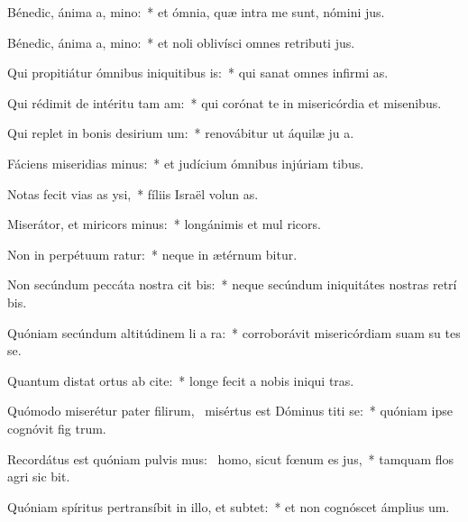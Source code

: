 \item Bénedic, ánima a, mino:~* et ómnia, quæ intra me sunt, nómini  jus.
\item Bénedic, ánima a, mino:~* et noli oblivísci omnes retributi jus.
\item Qui propitiátur ómnibus iniquitibus is:~* qui sanat omnes infirmi as.
\item Qui rédimit de intéritu tam am:~* qui corónat te in misericórdia et misenibus.
\item Qui replet in bonis desirium um:~* renovábitur ut áquilæ ju a.
\item Fáciens miseridias minus:~* et judícium ómnibus injúriam tibus.
\item Notas fecit vias as ysi,~* fíliis Israël volun as.
\item Miserátor, et miricors minus:~* longánimis et mul ricors.
\item Non in perpétuum ratur:~* neque in ætérnum bitur.
\item Non secúndum peccáta nostra cit bis:~* neque secúndum iniquitátes nostras retrí bis.
\item Quóniam secúndum altitúdinem li a ra:~* corroborávit misericórdiam suam su tes se.
\item Quantum distat ortus ab cite:~* longe fecit a nobis iniqui tras.
\item Quómodo miserétur pater filirum,~\pscross{} misértus est Dóminus titi se:~* quóniam ipse cognóvit fig trum.
\item Recordátus est quóniam pulvis mus:~\pscross{} homo, sicut fœnum es jus,~* tamquam flos agri sic bit.
\item Quóniam spíritus pertransíbit in illo, et  subtet:~* et non cognóscet ámplius  um.
